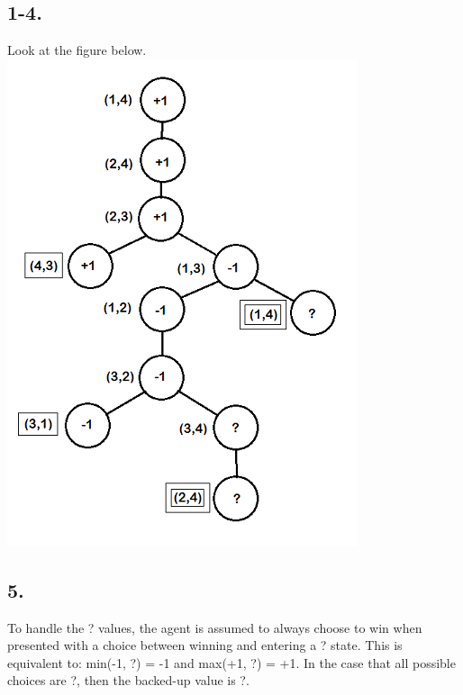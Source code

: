 \documentclass{article}
\begin{document}
	\subsection*{1-4.}
	Look at the figure below.
	\newline
	\includegraphics[scale=0.65]{9.png}
	\label{fig:9}
	\subsection*{5.}
	To handle the ? values, the agent is assumed to always choose to win when presented with a choice between winning and entering a ? state. This is equivalent to: min(-1, ?) = -1 and 		max(+1, ?) = +1. In the case that all possible choices are ?, then the backed-up value is ?.\newline
\end{document}
